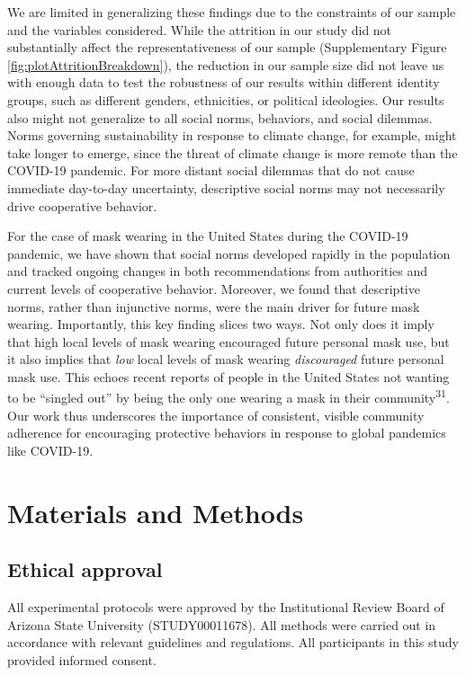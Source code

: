 \documentclass[
  man, donotrepeattitle,floatsintext]{apa6}
\begin{document}
We are limited in generalizing these findings due to the constraints of our sample and the variables considered. While the attrition in our study did not substantially affect the representativeness of our sample (Supplementary Figure \ref{fig:plotAttritionBreakdown}),
the reduction in our sample size did not leave us with enough data to test the robustness of our results within different identity groups, such as different genders, ethnicities, or political ideologies. Our results also might not generalize to all social norms, behaviors, and social dilemmas. Norms governing sustainability in response to climate change, for example, might take longer to emerge, since the threat of climate change is more remote than the COVID-19 pandemic. For more distant social dilemmas that do not cause immediate day-to-day uncertainty, descriptive social norms may not necessarily drive cooperative behavior.

For the case of mask wearing in the United States during the COVID-19 pandemic, we have shown that social norms developed rapidly in the population and tracked ongoing changes in both recommendations from authorities and current levels of cooperative behavior. Moreover, we found that descriptive norms, rather than injunctive norms, were the main driver for future mask wearing. Importantly, this key finding slices two ways. Not only does it imply that high local levels of mask wearing encouraged future personal mask use, but it also implies that \emph{low} local levels of mask wearing \emph{discouraged} future personal mask use. This echoes recent reports of people in the United States not wanting to be ``singled out'' by being the only one wearing a mask in their community\textsuperscript{31}. Our work thus underscores the importance of consistent, visible community adherence for encouraging protective behaviors in response to global pandemics like COVID-19.

\hypertarget{materials-and-methods}{%
\section{Materials and Methods}\label{materials-and-methods}}

\hypertarget{ethical-approval}{%
\subsection{Ethical approval}\label{ethical-approval}}

All experimental protocols were approved by the Institutional Review Board of Arizona State University (STUDY00011678). All methods were carried out in accordance with relevant guidelines and regulations. All participants in this study provided informed consent.
\end{document}
